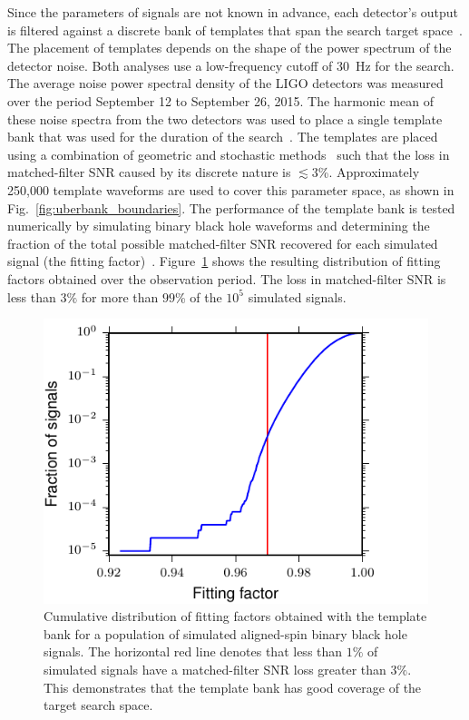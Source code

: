 Since the parameters of signals are not known in advance, each detector's
output is filtered against a discrete bank of templates that span the search
target
space~\cite{Sathyaprakash:1991mt,Owen:1995tm,Owen:1998dk,Babak:2006ty,Cokelaer:2007kx}.
The placement of templates depends on the shape of the power spectrum of the
detector noise. Both analyses use a low-frequency cutoff of $30$~Hz for the search. 
The average noise power spectral density of the LIGO detectors
was measured over the period September 12 to September 26, 2015. The harmonic
mean of these noise spectra from the two detectors was used to place a single
template bank that was used for the duration of the
search~\cite{Keppel:2013uma,Usman:2015kfa}. The templates are placed using a combination of
geometric and stochastic
methods~\cite{Harry:2009ea,Brown:2012qf,Privitera:2013xza,Capano:2016uif}
such that the loss in matched-filter SNR caused by its discrete nature is
$\lesssim 3$\%. 
Approximately 250,000 template waveforms are used to cover
this parameter space, as shown in Fig.~\ref{fig:uberbank_boundaries}.  The
performance of the template bank is tested numerically by simulating binary
black hole waveforms and determining the fraction of the total possible
matched-filter SNR recovered for each simulated signal (the fitting
factor)~\cite{Apostolatos:1996rf}.  Figure~\ref{fig:uberbank_effectualness}
shows the resulting distribution of fitting factors obtained over the
observation period. The loss in matched-filter SNR is less than $3\%$ for more
than $99$\% of the $10^5$ simulated signals.
\begin{figure}[t]
\includegraphics[width=\columnwidth]{figs/chapter2/uberbank_effectualness.pdf} 
\caption{\label{fig:uberbank_effectualness}
Cumulative distribution of fitting factors obtained with the template bank for
a  population of simulated aligned-spin binary black hole signals.  The horizontal
red line denotes that less than $1\%$ of simulated 
signals have a matched-filter SNR loss greater than $3\%$. This demonstrates that the
template bank has good coverage of the target search space.}
\end{figure}

